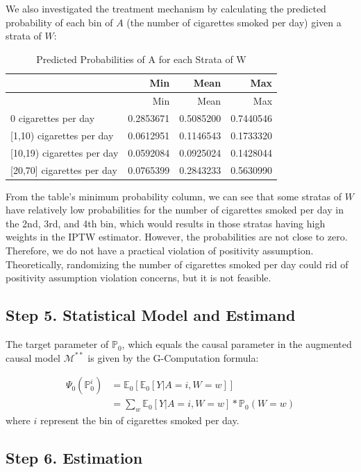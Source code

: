 \documentclass[]{article}
\begin{document}
We also investigated the treatment mechanism by calculating the
predicted probability of each bin of \(A\) (the number of cigarettes
smoked per day) given a strata of \(W\):

\begin{longtable}[]{@{}lrrr@{}}
\caption{Predicted Probabilities of A for each Strata of
W}\tabularnewline
\toprule
& Min & Mean & Max\tabularnewline
\midrule
\endfirsthead
\toprule
& Min & Mean & Max\tabularnewline
\midrule
\endhead
0 cigarettes per day & 0.2853671 & 0.5085200 & 0.7440546\tabularnewline
{[}1,10) cigarettes per day & 0.0612951 & 0.1146543 &
0.1733320\tabularnewline
{[}10,19) cigarettes per day & 0.0592084 & 0.0925024 &
0.1428044\tabularnewline
{[}20,70{]} cigarettes per day & 0.0765399 & 0.2843233 &
0.5630990\tabularnewline
\bottomrule
\end{longtable}

From the table's minimum probability column, we can see that some
stratas of \(W\) have relatively low probabilities for the number of
cigarettes smoked per day in the 2nd, 3rd, and 4th bin, which would
results in those stratas having high weights in the IPTW estimator.
However, the probabilities are not close to zero. Therefore, we do not
have a practical violation of positivity assumption. Theoretically,
randomizing the number of cigarettes smoked per day could rid of
positivity assumption violation concerns, but it is not feasible.

\subsection{Step 5. Statistical Model and
Estimand}\label{step-5.-statistical-model-and-estimand}

The target parameter of \(\mathbb{P}_0\), which equals the causal
parameter in the augmented causal model \(\mathcal{M}^{**}\) is given by
the G-Computation formula:

\[
\begin{aligned}
\Psi_0(\mathbb{P}^i_0)&=\mathbb{E}_0[\mathbb{E}_0[Y|A= i,W=w]]\\
&= \sum_w\mathbb{E}_0[Y|A=i,W=w]*\mathbb{P}_0(W=w)
\end{aligned}
\] where \(i\) represent the bin of cigarettes smoked per day.

\subsection{Step 6. Estimation}\label{step-6.-estimation}
\end{document}
